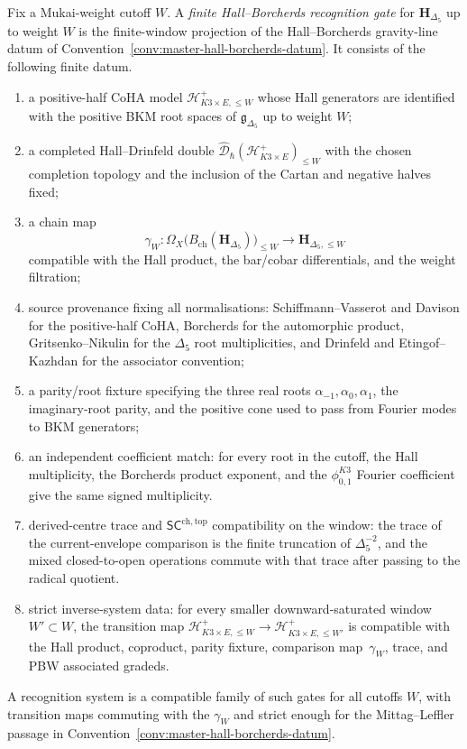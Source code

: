 \begin{definition}
\label{def:finite-hall-borcherds-recognition-gate}
Fix a Mukai-weight cutoff $W$. A \emph{finite Hall--Borcherds
recognition gate} for $\mathbf H_{\Delta_5}$ up to weight $W$ is the
finite-window projection of the Hall--Borcherds gravity-line datum of
Convention~\ref{conv:master-hall-borcherds-datum}. It consists of the
following finite datum.
\begin{enumerate}[label=\textup{(\roman*)}]
\item a positive-half CoHA model
$\mathcal H^+_{K3\times E,\le W}$ whose Hall generators are identified
with the positive BKM root spaces of $\mathfrak g_{\Delta_5}$ up to
weight $W$;
\item a completed Hall--Drinfeld double
$\widehat{\mathcal D}_\hbar(\mathcal H^+_{K3\times E})_{\le W}$ with
the chosen completion topology and the inclusion of the Cartan and
negative halves fixed;
\item a chain map
\[
\gamma_W\colon
\Omega_X\bigl(B_{\mathrm{ch}}(\mathbf H_{\Delta_5})\bigr)_{\le W}
\longrightarrow
\mathbf H_{\Delta_5,\le W}
\]
compatible with the Hall product, the bar/cobar differentials, and the
weight filtration;
\item source provenance fixing all normalisations: Schiffmann--Vasserot
and Davison for the positive-half CoHA, Borcherds for the automorphic
product, Gritsenko--Nikulin for the $\Delta_5$ root multiplicities, and
Drinfeld and Etingof--Kazhdan for the associator convention;
\item a parity/root fixture specifying the three real roots
$\alpha_{-1},\alpha_0,\alpha_1$, the imaginary-root parity, and the
positive cone used to pass from Fourier modes to BKM generators;
\item an independent coefficient match: for every root in the cutoff,
the Hall multiplicity, the Borcherds product exponent, and the
$\phi_{0,1}^{K3}$ Fourier coefficient give the same signed
multiplicity.
\item derived-centre trace and $\mathsf{SC}^{\mathrm{ch,top}}$
compatibility on the window: the trace of the current-envelope
comparison is the finite truncation of
$\Delta_5^{-2}$, and the mixed closed-to-open operations commute with
that trace after passing to the radical quotient.
\item strict inverse-system data: for every smaller downward-saturated
window $W'\subset W$, the transition map
$\mathcal H^+_{K3\times E,\le W}\to
\mathcal H^+_{K3\times E,\le W'}$ is compatible with the Hall product,
coproduct, parity fixture, comparison map~$\gamma_W$, trace, and
PBW associated gradeds.
\end{enumerate}
A recognition system is a compatible family of such gates for all
cutoffs $W$, with transition maps commuting with the $\gamma_W$ and
strict enough for the Mittag--Leffler passage in
Convention~\ref{conv:master-hall-borcherds-datum}.
\end{definition}

